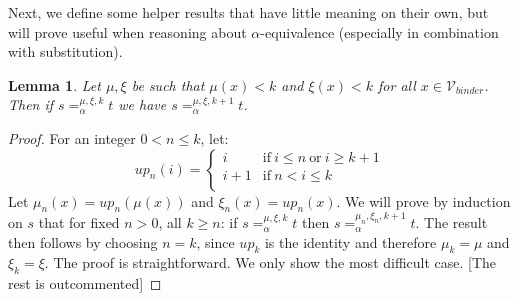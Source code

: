 \documentclass{lmcs}
\theoremstyle{theorem}\newtheorem{theorem}{Theorem}
\theoremstyle{theorem}\newtheorem{lemma}[theorem]{Lemma}
\theoremstyle{theorem}\newtheorem{corollary}[theorem]{Corollary}
\theoremstyle{definition}\newtheorem{definition}[theorem]{Definition}
\theoremstyle{definition}\newtheorem{example}[theorem]{Example}
\newcommand{\Vbound}{\mathcal{V}_{\mathit{binder}}}
\newcommand{\avar}{x}
\begin{document}
Next, we define some helper results that have little meaning on their own, but
will prove useful when reasoning about $\alpha$-equivalence (especially in
combination with substitution).

\begin{lemma}\label{lem:alphaincrease}
Let $\mu,\xi$ be such that $\mu(\avar) < k$ and $\xi(\avar) < k$ for all
$\avar \in \Vbound$. \\
Then if $s =_\alpha^{\mu,\xi,k} t$ we have $s =_\alpha^{\mu,\xi,k+1} t$.
\end{lemma}

\begin{proof}
For an integer $0 < n \leq k$, let:
\[\mathit{up}_n(i) = \left\{
\begin{array}{ll}
i & \text{if}\ i \leq n\ \text{or}\ i \geq k+1 \\
i+1 & \text{if}\ n < i \leq k \\
\end{array}
\right.
\]
Let $\mu_n(x) = \mathit{up}_n(\mu(x))$ and $\xi_n(x) = \mathit{up}_n(x)$.
We will prove by induction on $s$ that for fixed $n > 0$, all $k \geq n$:
if $s =_\alpha^{\mu,\xi,k} t$ then $s =_\alpha^{\mu_n,\xi_n,k+1} t$.
The result then follows by choosing $n = k$, since $\mathit{up}_k$ is the
identity and therefore $\mu_k = \mu$ and $\xi_k = \xi$.
The proof is straightforward. We only show the most difficult case.
[The rest is outcommented]


\end{proof}
\end{document}
